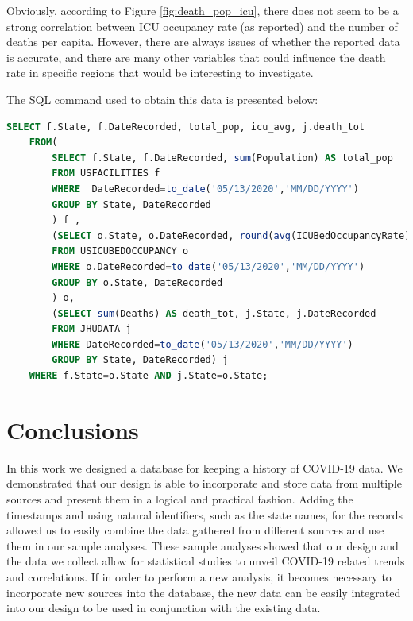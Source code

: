 \documentclass[11pt]{article}
\begin{document}
\noindent
Obviously, according to Figure \ref{fig:death_pop_icu}, there does not seem to be a strong correlation between ICU occupancy rate (as reported) and the number of deaths per capita. However, there are always issues of whether the reported data is accurate, and there are many other variables that could influence the death rate in specific regions that would be interesting to investigate.
\pagebreak

\noindent
The SQL command used to obtain this data is presented below:
\begin{lstlisting}[language=SQL,
        deletekeywords={IDENTITY,INT},
        morekeywords={clustered},    
        framesep=10pt,
        framextopmargin=10pt]
    SELECT f.State, f.DateRecorded, total_pop, icu_avg, j.death_tot 
    FROM(
        SELECT f.State, f.DateRecorded, sum(Population) AS total_pop 
        FROM USFACILITIES f 
        WHERE  DateRecorded=to_date('05/13/2020','MM/DD/YYYY')  
        GROUP BY State, DateRecorded
        ) f , 
        (SELECT o.State, o.DateRecorded, round(avg(ICUBedOccupancyRate),3) AS     icu_avg 
        FROM USICUBEDOCCUPANCY o 
        WHERE o.DateRecorded=to_date('05/13/2020','MM/DD/YYYY')  
        GROUP BY o.State, DateRecorded
        ) o, 
        (SELECT sum(Deaths) AS death_tot, j.State, j.DateRecorded 
        FROM JHUDATA j 
        WHERE DateRecorded=to_date('05/13/2020','MM/DD/YYYY')   
        GROUP BY State, DateRecorded) j 
    WHERE f.State=o.State AND j.State=o.State;\end{lstlisting}

\pagebreak

\section{Conclusions}
\label{sec:conclusion}

\noindent
In this work we designed a database for keeping a history of COVID-19 data. We demonstrated that our design is able to incorporate and store data from multiple sources and present them in a logical and practical fashion. Adding the timestamps and using natural identifiers, such as the state names, for the records allowed us to easily combine the data gathered from different sources and use them in our sample analyses. These sample analyses showed that our design and the data we collect allow for statistical studies to unveil COVID-19 related trends and correlations. If in order to perform a new analysis, it becomes necessary to incorporate new sources into the database, the new data can be easily integrated into our design to be used in conjunction with the existing data.\\
\end{document}
